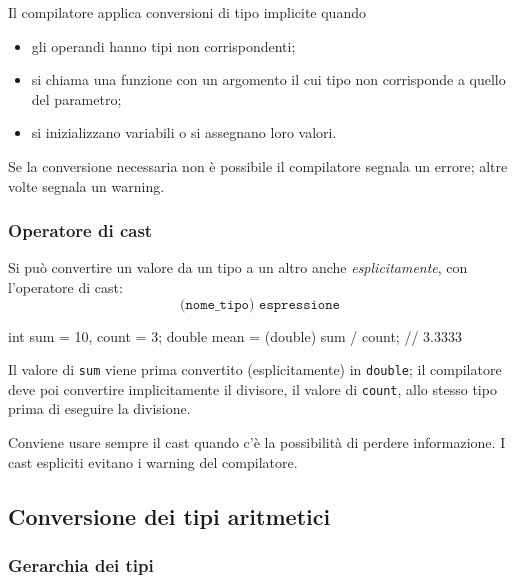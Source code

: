 \documentclass[11pt,a4paper]{article}
\begin{document}
Il compilatore applica conversioni di tipo implicite quando
\begin{itemize}
    \item gli operandi hanno tipi non corrispondenti;
    \item si chiama una funzione con un argomento il cui tipo non corrisponde a quello del parametro;
    \item si inizializzano variabili o si assegnano loro valori.
\end{itemize}
Se la conversione necessaria non è possibile il compilatore segnala un errore; altre volte segnala un warning.

\subsubsection{Operatore di cast}

Si può convertire un valore da un tipo a un altro anche \emph{esplicitamente}, con l'operatore di cast:
\[
\texttt{(nome\_tipo) espressione}
\]

\begin{codice}
int sum = 10, count = 3;
double mean = (double) sum / count;   // 3.3333
\end{codice}

Il valore di \lstinline|sum| viene prima convertito (esplicitamente) in \lstinline|double|; il compilatore deve poi convertire implicitamente il divisore, il valore di \lstinline|count|, allo stesso tipo prima di eseguire la divisione.

\begin{osservazione}
Conviene usare sempre il cast quando c'è la possibilità di perdere informazione. I cast espliciti evitano i warning del compilatore.
\end{osservazione}

\subsection{Conversione dei tipi aritmetici}

\subsubsection{Gerarchia dei tipi}
\end{document}
